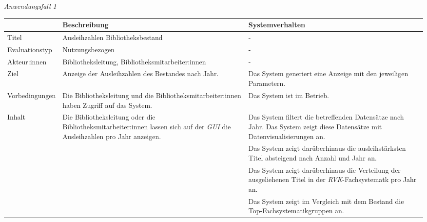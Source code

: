 \noindent
\textit{Anwendungsfall 1}
\begingroup
\setlength{\tabcolsep}{10pt} %
\renewcommand{\arraystretch}{1.15} 
\begin{table}[h]
    \centering
    \begin{adjustbox}{max width=\textwidth}
    \begin{tabular}{lp{7.5cm}p{7.5cm}}
       \toprule
       \textbf{}          & \textbf{Beschreibung} &\textbf{Systemverhalten}\\
       \midrule
        Titel                            &Ausleihzahlen Bibliotheksbestand  & -\\
        Evaluationstyp                   &Nutzungsbezogen                   & -\\
        Akteur:innen                     &Bibliotheksleitung, Bibliotheksmitarbeiter:innen & -\\
        Ziel                             &Anzeige der Ausleihzahlen des Bestandes nach Jahr. & Das System generiert eine Anzeige mit den jeweiligen Parametern.\\
        Vorbedingungen                   &Die Bibliotheksleitung und die Bibliotheksmitarbeiter:innen haben Zugriff auf das System. & Das System ist im Betrieb.\\
        Inhalt                           &Die Bibliotheksleitung oder die Bibliotheksmitarbeiter:innen lassen sich auf der \textit{\acrshort{GUI}} die Ausleihzahlen pro Jahr anzeigen. & Das System filtert die betreffenden Datensätze nach Jahr. Das System zeigt diese Datensätze mit Datenvisualisierungen an.\\
                                         & &Das System zeigt darüberhinaus die ausleihstärksten Titel absteigend nach Anzahl und Jahr an.\\
                                         & &Das System zeigt darüberhinaus die Verteilung der ausgeliehenen Titel in der \textit{\acrshort{RVK}}-Fachsystematk pro Jahr an.\\
                                         & &Das System zeigt im Vergleich mit dem Bestand die Top-Fachsystematikgruppen an.\\

\end{tabular}
\end{adjustbox}
\end{table}
